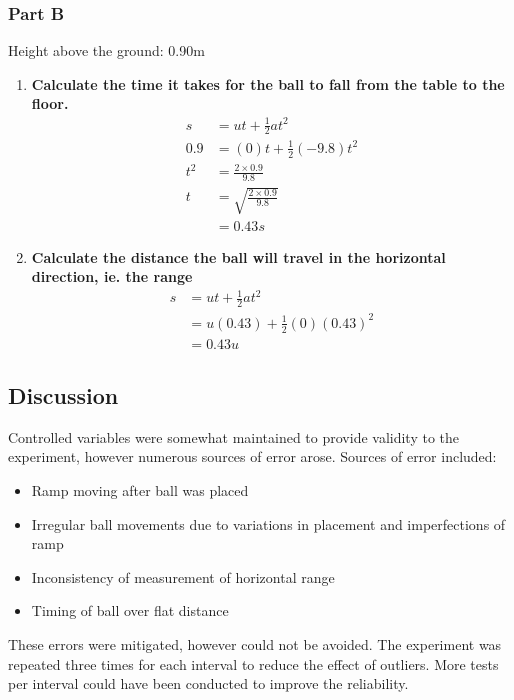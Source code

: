 		\subsubsection{Part B}
			Height above the ground: 0.90m
			\begin{enumerate}
				\item \textbf{Calculate the time it takes for the ball to fall from the table to the floor.}
					\begin{align}
						s &= ut + \frac{1}{2}at^2 \\
						0.9 &= (0)t + \frac{1}{2}(-9.8)t^2 \\
						t^2 &= \frac{2 \times 0.9}{9.8} \\
						t &= \sqrt{\frac{2 \times 0.9}{9.8}} \\
						&= 0.43 s
					\end{align} 
				\item \textbf{Calculate the distance the ball will travel in the horizontal direction, ie. the range}
					\begin{align*}
						s &= ut + \frac{1}{2}at^2 \\
						&= u(0.43) + \frac{1}{2}(0)(0.43)^2\\
						&= 0.43u
					\end{align*}
			\end{enumerate}

	\subsection{Discussion}
		Controlled variables were somewhat maintained to provide validity to the experiment, however numerous sources of error arose. Sources of error included:
		\begin{itemize}
			\item Ramp moving after ball was placed
			\item Irregular ball movements due to variations in placement and imperfections of ramp
			\item Inconsistency of measurement of horizontal range
			\item Timing of ball over flat distance
		\end{itemize}
		These errors were mitigated, however could not be avoided. The experiment was repeated three times for each interval to reduce the effect of outliers. More tests per interval could have been conducted to improve the reliability.
	
